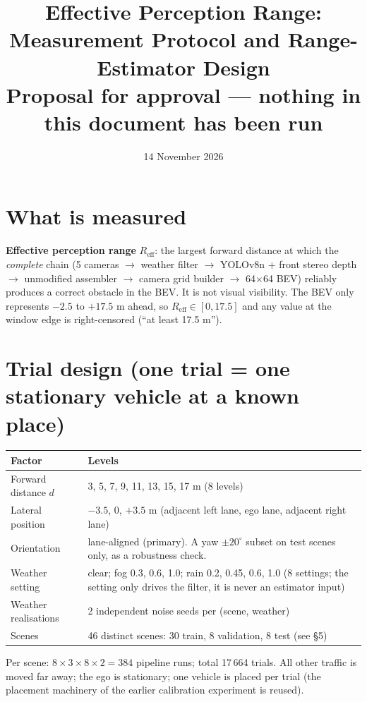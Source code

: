 \documentclass[11pt,a4paper]{article}
\title{Effective Perception Range: Measurement Protocol and Range-Estimator Design\\\large Proposal for approval --- nothing in this document has been run}
\date{14 November 2026}\author{}
\begin{document}
\maketitle

\section{What is measured}
\textbf{Effective perception range} $R_{\mathrm{eff}}$: the largest forward distance at which the \emph{complete} chain (5 cameras $\to$ weather filter $\to$ YOLOv8n + front stereo depth $\to$ unmodified assembler $\to$ camera grid builder $\to$ 64$\times$64 BEV) reliably produces a correct obstacle in the BEV. It is not visual visibility. The BEV only represents $-2.5$ to $+17.5$ m ahead, so $R_{\mathrm{eff}}\in[0,17.5]$ and any value at the window edge is right-censored (``at least 17.5 m'').

\section{Trial design (one trial = one stationary vehicle at a known place)}
\begin{center}\small\begin{tabular}{@{}lp{10.2cm}@{}}\toprule
Factor & Levels\\\midrule
Forward distance $d$ & 3, 5, 7, 9, 11, 13, 15, 17 m (8 levels)\\
Lateral position & $-3.5$, 0, $+3.5$ m (adjacent left lane, ego lane, adjacent right lane)\\
Orientation & lane-aligned (primary). A yaw $\pm20^{\circ}$ subset on test scenes only, as a robustness check.\\
Weather setting & clear; fog 0.3, 0.6, 1.0; rain 0.2, 0.45, 0.6, 1.0 (8 settings; the setting only drives the filter, it is never an estimator input)\\
Weather realisations & 2 independent noise seeds per (scene, weather)\\
Scenes & 46 distinct scenes: 30 train, 8 validation, 8 test (see \S5)\\\bottomrule\end{tabular}\end{center}
Per scene: $8\times3\times8\times2=384$ pipeline runs; total 17\,664 trials. All other traffic is moved far away; the ego is stationary; one vehicle is placed per trial (the placement machinery of the earlier calibration experiment is reused).
\end{document}
